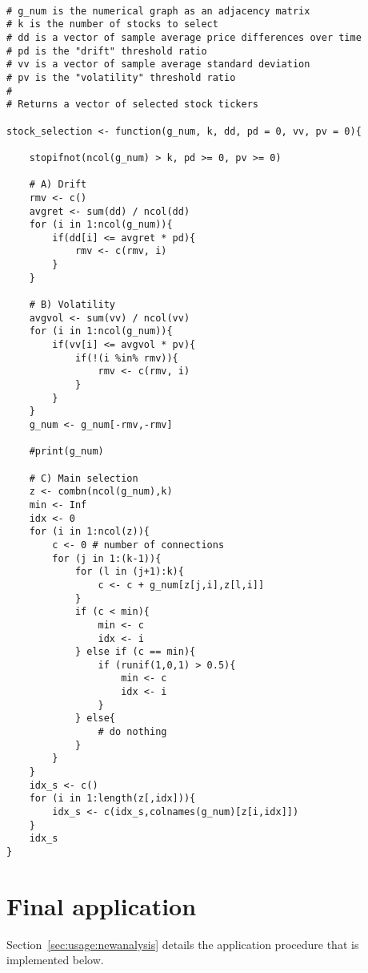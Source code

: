 {
\begin{lstlisting}

# g_num is the numerical graph as an adjacency matrix
# k is the number of stocks to select
# dd is a vector of sample average price differences over time
# pd is the "drift" threshold ratio
# vv is a vector of sample average standard deviation
# pv is the "volatility" threshold ratio
#
# Returns a vector of selected stock tickers

stock_selection <- function(g_num, k, dd, pd = 0, vv, pv = 0){

	stopifnot(ncol(g_num) > k, pd >= 0, pv >= 0)
	
	# A) Drift
	rmv <- c()
	avgret <- sum(dd) / ncol(dd)
	for (i in 1:ncol(g_num)){
		if(dd[i] <= avgret * pd){
			rmv <- c(rmv, i)
		}
	}
	
	# B) Volatility
	avgvol <- sum(vv) / ncol(vv)
	for (i in 1:ncol(g_num)){
		if(vv[i] <= avgvol * pv){
			if(!(i %in% rmv)){
				rmv <- c(rmv, i)
			}
		}
	}
	g_num <- g_num[-rmv,-rmv]
	
	#print(g_num)
	
	# C) Main selection
	z <- combn(ncol(g_num),k)
	min <- Inf
	idx <- 0 
	for (i in 1:ncol(z)){
		c <- 0 # number of connections
		for (j in 1:(k-1)){
			for (l in (j+1):k){
				c <- c + g_num[z[j,i],z[l,i]]
			}
			if (c < min){
				min <- c
				idx <- i
			} else if (c == min){
				if (runif(1,0,1) > 0.5){
					min <- c
					idx <- i
				}
			} else{
				# do nothing
			}
		}
	}
	idx_s <- c()
	for (i in 1:length(z[,idx])){
		idx_s <- c(idx_s,colnames(g_num)[z[i,idx]])
	}
	idx_s
}
\end{lstlisting}
}










\section{Final application}
\label{sec:appendicies:usage:newanalysis}

Section~\ref{sec:usage:newanalysis} details the application procedure that is 
implemented below.

